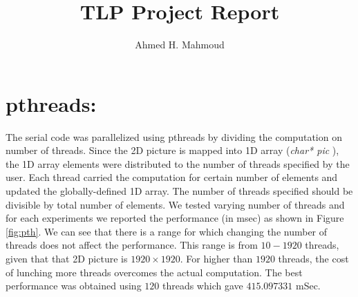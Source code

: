 \documentclass[12pt] {article}
\begin{document}
\title{TLP Project Report}
\author{Ahmed H. Mahmoud}
\date{}
\maketitle

  



\section{pthreads:}
The serial code was parallelized using pthreads by dividing the computation on number of threads. Since the 2D picture is mapped into 1D array (\emph{char* pic }), the 1D array elements were distributed to the number of threads specified by the user. Each thread carried the computation for certain number of elements and updated the globally-defined 1D array. The number of threads specified should be divisible by total number of elements. We tested varying number of threads and for each experiments we reported the performance (in msec) as shown in Figure \ref{fig:pth}. We can see that there is a range for which changing the number of threads does not affect the performance. This range is from $10-1920$ threads, given that that 2D picture is $1920\times 1920$. For higher than $1920$ threads, the cost of lunching more threads overcomes the actual computation. The best performance was obtained using $120$ threads which gave $415.097331$ mSec. 
\end{document}
